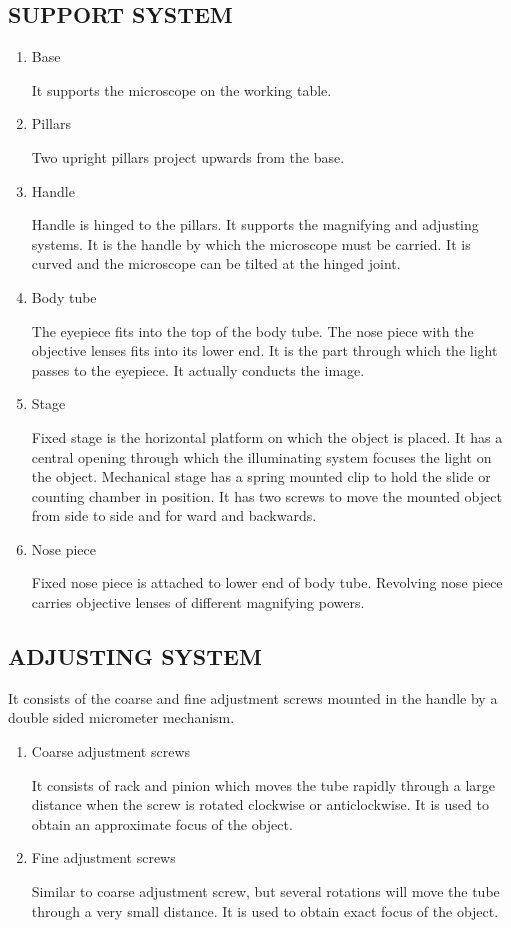 \documentclass[12pt]{book}
\begin{document}
		\subsection{SUPPORT SYSTEM}
		\begin{enumerate}
		\item{Base \par It supports the microscope on the working table.}
		\item{Pillars \par Two upright pillars project upwards from the base.}
		\item{Handle \par Handle is hinged to the pillars. It supports the magnifying and adjusting systems. It is the handle by which the microscope must be carried. It is curved and the microscope can be tilted at the hinged joint.}
		\item{Body tube \par The eyepiece fits into the top of the body tube. The nose piece with the objective lenses fits into its lower end. It is the part through which the light passes to the eyepiece. It actually conducts the image.}
		\item{Stage \par Fixed stage is the horizontal platform on which the object is placed. It has a central opening through which the illuminating system focuses the light on the object. Mechanical stage has a spring mounted clip to hold the slide or counting chamber in position. It has two screws to move the mounted object from side to side and for ward and backwards.}
		\item {Nose piece \par Fixed nose piece is attached to lower end of body tube. Revolving nose piece carries objective lenses of different magnifying powers.}
		\end{enumerate}

		\subsection{ADJUSTING SYSTEM}
		It consists of the coarse and fine adjustment screws mounted in the handle by a double sided micrometer mechanism.
		\begin{enumerate}
		\item{Coarse adjustment screws \par It consists of rack and pinion which moves the tube rapidly through a large distance when the screw is rotated clockwise or anticlockwise. It is used to obtain an approximate focus of the object.}
		\item{Fine adjustment screws \par Similar to coarse adjustment screw, but several rotations will move the tube through a very small distance. It is used to obtain exact focus of the object.}
		\end{enumerate}
\end{document}
